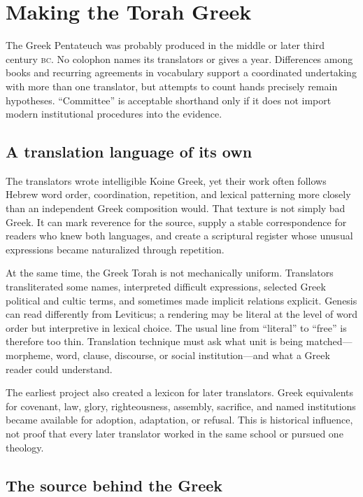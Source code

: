 \section{Making the Torah Greek}

The Greek Pentateuch was probably produced in the middle or later third century \textsc{bc}. No colophon names its translators or gives a year. Differences among books and recurring agreements in vocabulary support a coordinated undertaking with more than one translator, but attempts to count hands precisely remain hypotheses. “Committee” is acceptable shorthand only if it does not import modern institutional procedures into the evidence.

\subsection{A translation language of its own}

The translators wrote intelligible Koine Greek, yet their work often follows Hebrew word order, coordination, repetition, and lexical patterning more closely than an independent Greek composition would. That texture is not simply bad Greek. It can mark reverence for the source, supply a stable correspondence for readers who knew both languages, and create a scriptural register whose unusual expressions became naturalized through repetition.

At the same time, the Greek Torah is not mechanically uniform. Translators transliterated some names, interpreted difficult expressions, selected Greek political and cultic terms, and sometimes made implicit relations explicit. Genesis can read differently from Leviticus; a rendering may be literal at the level of word order but interpretive in lexical choice. The usual line from “literal” to “free” is therefore too thin. Translation technique must ask what unit is being matched---morpheme, word, clause, discourse, or social institution---and what a Greek reader could understand.

The earliest project also created a lexicon for later translators. Greek equivalents for covenant, law, glory, righteousness, assembly, sacrifice, and named institutions became available for adoption, adaptation, or refusal. This is historical influence, not proof that every later translator worked in the same school or pursued one theology.

\subsection{The source behind the Greek}

